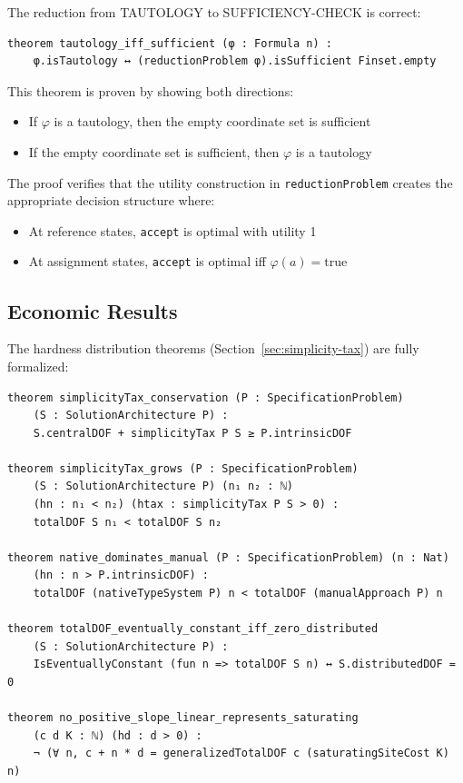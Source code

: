 \begin{theorem}
The reduction from TAUTOLOGY to SUFFICIENCY-CHECK is correct:
\end{theorem}

\begin{verbatim}
theorem tautology_iff_sufficient (φ : Formula n) :
    φ.isTautology ↔ (reductionProblem φ).isSufficient Finset.empty
\end{verbatim}

This theorem is proven by showing both directions:
\begin{itemize}
\item If $\varphi$ is a tautology, then the empty coordinate set is sufficient
\item If the empty coordinate set is sufficient, then $\varphi$ is a tautology
\end{itemize}

The proof verifies that the utility construction in \texttt{reductionProblem} creates the appropriate decision structure where:
\begin{itemize}
\item At reference states, \texttt{accept} is optimal with utility 1
\item At assignment states, \texttt{accept} is optimal iff $\varphi(a) = \text{true}$
\end{itemize}

\subsection{Economic Results}

The hardness distribution theorems (Section~\ref{sec:simplicity-tax}) are fully formalized:

\begin{verbatim}
theorem simplicityTax_conservation (P : SpecificationProblem)
    (S : SolutionArchitecture P) :
    S.centralDOF + simplicityTax P S ≥ P.intrinsicDOF

theorem simplicityTax_grows (P : SpecificationProblem)
    (S : SolutionArchitecture P) (n₁ n₂ : ℕ)
    (hn : n₁ < n₂) (htax : simplicityTax P S > 0) :
    totalDOF S n₁ < totalDOF S n₂

theorem native_dominates_manual (P : SpecificationProblem) (n : Nat)
    (hn : n > P.intrinsicDOF) :
    totalDOF (nativeTypeSystem P) n < totalDOF (manualApproach P) n

theorem totalDOF_eventually_constant_iff_zero_distributed
    (S : SolutionArchitecture P) :
    IsEventuallyConstant (fun n => totalDOF S n) ↔ S.distributedDOF = 0

theorem no_positive_slope_linear_represents_saturating
    (c d K : ℕ) (hd : d > 0) :
    ¬ (∀ n, c + n * d = generalizedTotalDOF c (saturatingSiteCost K) n)
\end{verbatim}

